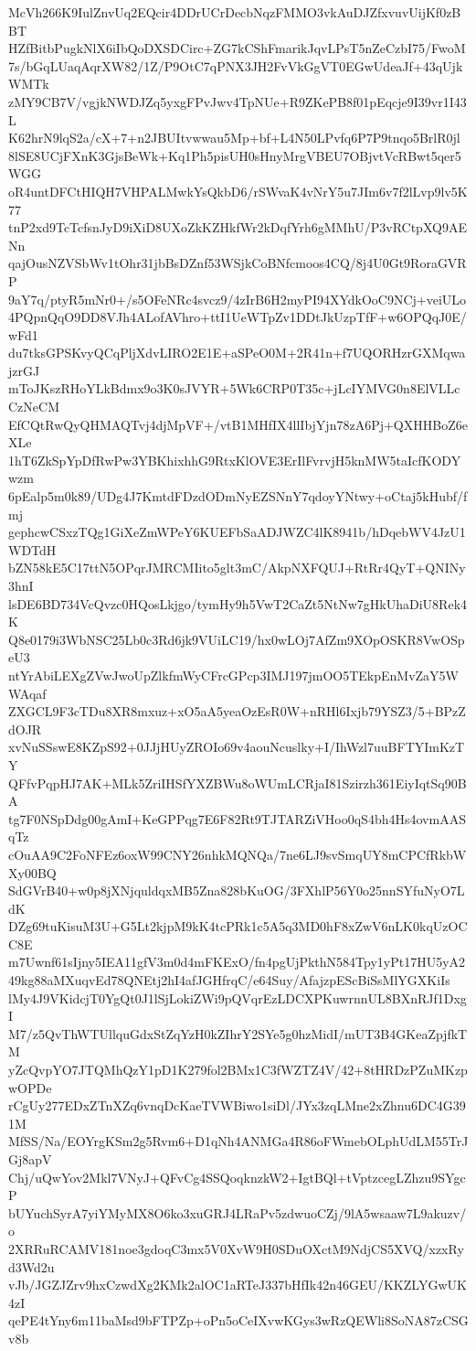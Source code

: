 McVh266K9IulZnvUq2EQcir4DDrUCrDecbNqzFMMO3vkAuDJZfxvuvUijKf0zBBT
HZfBitbPugkNlX6iIbQoDXSDCirc+ZG7kCShFmarikJqvLPsT5nZeCzbI75/FwoM
7s/bGqLUaqAqrXW82/1Z/P9OtC7qPNX3JH2FvVkGgVT0EGwUdeaJf+43qUjkWMTk
zMY9CB7V/vgjkNWDJZq5yxgFPvJwv4TpNUe+R9ZKePB8f01pEqcje9I39vr1I43L
K62hrN9lqS2a/cX+7+n2JBUItvwwau5Mp+bf+L4N50LPvfq6P7P9tnqo5BrlR0jl
8lSE8UCjFXnK3GjsBeWk+Kq1Ph5pisUH0sHnyMrgVBEU7OBjvtVcRBwt5qer5WGG
oR4untDFCtHIQH7VHPALMwkYsQkbD6/rSWvaK4vNrY5u7JIm6v7f2lLvp9lv5K77
tnP2xd9TcTcfsnJyD9iXiD8UXoZkKZHkfWr2kDqfYrh6gMMhU/P3vRCtpXQ9AENn
qajOusNZVSbWv1tOhr31jbBsDZnf53WSjkCoBNfcmoos4CQ/8j4U0Gt9RoraGVRP
9aY7q/ptyR5mNr0+/s5OFeNRc4svcz9/4zIrB6H2myPI94XYdkOoC9NCj+veiULo
4PQpnQqO9DD8VJh4ALofAVhro+ttI1UeWTpZv1DDtJkUzpTfF+w6OPQqJ0E/wFd1
du7tksGPSKvyQCqPljXdvLIRO2E1E+aSPeO0M+2R41n+f7UQORHzrGXMqwajzrGJ
mToJKszRHoYLkBdmx9o3K0sJVYR+5Wk6CRP0T35c+jLcIYMVG0n8ElVLLcCzNeCM
EfCQtRwQyQHMAQTvj4djMpVF+/vtB1MHfIX4llIbjYjn78zA6Pj+QXHHBoZ6eXLe
1hT6ZkSpYpDfRwPw3YBKhixhhG9RtxKlOVE3ErIlFvrvjH5knMW5taIcfKODYwzm
6pEalp5m0k89/UDg4J7KmtdFDzdODmNyEZSNnY7qdoyYNtwy+oCtaj5kHubf/fmj
gephcwCSxzTQg1GiXeZmWPeY6KUEFbSaADJWZC4lK8941b/hDqebWV4JzU1WDTdH
bZN58kE5C17ttN5OPqrJMRCMIito5glt3mC/AkpNXFQUJ+RtRr4QyT+QNINy3hnI
lsDE6BD734VcQvzc0HQosLkjgo/tymHy9h5VwT2CaZt5NtNw7gHkUhaDiU8Rek4K
Q8e0179i3WbNSC25Lb0c3Rd6jk9VUiLC19/hx0wLOj7AfZm9XOpOSKR8VwOSpeU3
ntYrAbiLEXgZVwJwoUpZlkfmWyCFrcGPcp3IMJ197jmOO5TEkpEnMvZaY5WWAqaf
ZXGCL9F3cTDu8XR8mxuz+xO5aA5yeaOzEsR0W+nRHl6Ixjb79YSZ3/5+BPzZdOJR
xvNuSSswE8KZpS92+0JJjHUyZROIo69v4aouNcuslky+I/IhWzl7uuBFTYImKzTY
QFfvPqpHJ7AK+MLk5ZriIHSfYXZBWu8oWUmLCRjaI81Szirzh361EiyIqtSq90BA
tg7F0NSpDdg00gAmI+KeGPPqg7E6F82Rt9TJTARZiVHoo0qS4bh4Hs4ovmAASqTz
cOuAA9C2FoNFEz6oxW99CNY26nhkMQNQa/7ne6LJ9svSmqUY8mCPCfRkbWXy00BQ
SdGVrB40+w0p8jXNjquldqxMB5Zna828bKuOG/3FXhlP56Y0o25nnSYfuNyO7LdK
DZg69tuKisuM3U+G5Lt2kjpM9kK4tcPRk1c5A5q3MD0hF8xZwV6nLK0kqUzOCC8E
m7Uwnf61sIjny5IEA11gfV3m0d4mFKExO/fn4pgUjPkthN584Tpy1yPt17HU5yA2
49kg88aMXuqvEd78QNEtj2hI4afJGHfrqC/e64Suy/AfajzpEScBiSsMlYGXKiIs
lMy4J9VKidcjT0YgQt0J1lSjLokiZWi9pQVqrEzLDCXPKuwrnnUL8BXnRJf1DxgI
M7/z5QvThWTUllquGdxStZqYzH0kZIhrY2SYe5g0hzMidI/mUT3B4GKeaZpjfkTM
yZcQvpYO7JTQMhQzY1pD1K279fol2BMx1C3fWZTZ4V/42+8tHRDzPZuMKzpwOPDe
rCgUy277EDxZTnXZq6vnqDcKaeTVWBiwo1siDl/JYx3zqLMne2xZhnu6DC4G391M
MfSS/Na/EOYrgKSm2g5Rvm6+D1qNh4ANMGa4R86oFWmebOLphUdLM55TrJGj8apV
Chj/uQwYov2Mkl7VNyJ+QFvCg4SSQoqknzkW2+IgtBQl+tVptzcegLZhzu9SYgcP
bUYuchSyrA7yiYMyMX8O6ko3xuGRJ4LRaPv5zdwuoCZj/9lA5wsaaw7L9akuzv/o
2XRRuRCAMV181noe3gdoqC3mx5V0XvW9H0SDuOXctM9NdjCS5XVQ/xzxRyd3Wd2u
vJb/JGZJZrv9hxCzwdXg2KMk2alOC1aRTeJ337bHfIk42n46GEU/KKZLYGwUK4zI
qePE4tYny6m11baMsd9bFTPZp+oPn5oCeIXvwKGys3wRzQEWli8SoNA87zCSGv8b
